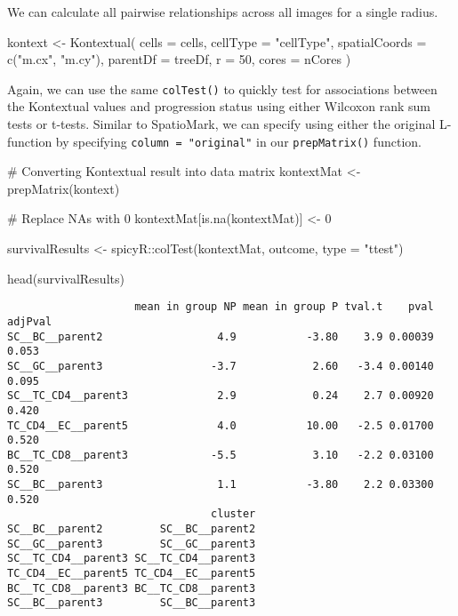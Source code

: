 \documentclass[
  letterpaper,
  DIV=11,
  numbers=noendperiod]{scrreprt}
\newenvironment{Shaded}{\begin{snugshade}}{\end{snugshade}}
\newcommand{\AttributeTok}[1]{\textcolor[rgb]{0.40,0.45,0.13}{#1}}
\newcommand{\CommentTok}[1]{\textcolor[rgb]{0.37,0.37,0.37}{#1}}
\newcommand{\DecValTok}[1]{\textcolor[rgb]{0.68,0.00,0.00}{#1}}
\newcommand{\FunctionTok}[1]{\textcolor[rgb]{0.28,0.35,0.67}{#1}}
\newcommand{\NormalTok}[1]{\textcolor[rgb]{0.00,0.23,0.31}{#1}}
\newcommand{\OtherTok}[1]{\textcolor[rgb]{0.00,0.23,0.31}{#1}}
\newcommand{\SpecialCharTok}[1]{\textcolor[rgb]{0.37,0.37,0.37}{#1}}
\newcommand{\StringTok}[1]{\textcolor[rgb]{0.13,0.47,0.30}{#1}}
\begin{document}
We can calculate all pairwise relationships across all images for a
single radius.

\begin{Shaded}
\begin{Highlighting}[]
\NormalTok{kontext }\OtherTok{\textless{}{-}} \FunctionTok{Kontextual}\NormalTok{(}
  \AttributeTok{cells =}\NormalTok{ cells,}
  \AttributeTok{cellType =} \StringTok{"cellType"}\NormalTok{,}
  \AttributeTok{spatialCoords =} \FunctionTok{c}\NormalTok{(}\StringTok{"m.cx"}\NormalTok{, }\StringTok{"m.cy"}\NormalTok{),}
  \AttributeTok{parentDf =}\NormalTok{ treeDf,}
  \AttributeTok{r =} \DecValTok{50}\NormalTok{,}
  \AttributeTok{cores =}\NormalTok{ nCores}
\NormalTok{)}
\end{Highlighting}
\end{Shaded}

Again, we can use the same \texttt{colTest()} to quickly test for
associations between the Kontextual values and progression status using
either Wilcoxon rank sum tests or t-tests. Similar to SpatioMark, we can
specify using either the original L-function by specifying
\texttt{column\ =\ "original"} in our \texttt{prepMatrix()} function.

\begin{Shaded}
\begin{Highlighting}[]
\CommentTok{\# Converting Kontextual result into data matrix}
\NormalTok{kontextMat }\OtherTok{\textless{}{-}} \FunctionTok{prepMatrix}\NormalTok{(kontext)}

\CommentTok{\# Replace NAs with 0}
\NormalTok{kontextMat[}\FunctionTok{is.na}\NormalTok{(kontextMat)] }\OtherTok{\textless{}{-}} \DecValTok{0}

\NormalTok{survivalResults }\OtherTok{\textless{}{-}}\NormalTok{ spicyR}\SpecialCharTok{::}\FunctionTok{colTest}\NormalTok{(kontextMat, outcome, }\AttributeTok{type =} \StringTok{"ttest"}\NormalTok{)}

\FunctionTok{head}\NormalTok{(survivalResults)}
\end{Highlighting}
\end{Shaded}

\begin{verbatim}
                    mean in group NP mean in group P tval.t    pval adjPval
SC__BC__parent2                  4.9           -3.80    3.9 0.00039   0.053
SC__GC__parent3                 -3.7            2.60   -3.4 0.00140   0.095
SC__TC_CD4__parent3              2.9            0.24    2.7 0.00920   0.420
TC_CD4__EC__parent5              4.0           10.00   -2.5 0.01700   0.520
BC__TC_CD8__parent3             -5.5            3.10   -2.2 0.03100   0.520
SC__BC__parent3                  1.1           -3.80    2.2 0.03300   0.520
                                cluster
SC__BC__parent2         SC__BC__parent2
SC__GC__parent3         SC__GC__parent3
SC__TC_CD4__parent3 SC__TC_CD4__parent3
TC_CD4__EC__parent5 TC_CD4__EC__parent5
BC__TC_CD8__parent3 BC__TC_CD8__parent3
SC__BC__parent3         SC__BC__parent3
\end{verbatim}
\end{document}
